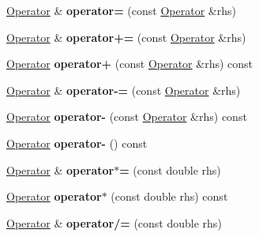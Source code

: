 \begin{DoxyCompactItemize}
\item 
\hypertarget{classOperator_afad114ba9dee8b9c08af0b5d27c3ba86}{\hyperlink{classOperator}{Operator} \& {\bfseries operator=} (const \hyperlink{classOperator}{Operator} \&rhs)}\label{classOperator_afad114ba9dee8b9c08af0b5d27c3ba86}

\item 
\hypertarget{classOperator_a0b20b0fedb0f49c4a2e69507cdcb540b}{\hyperlink{classOperator}{Operator} \& {\bfseries operator+=} (const \hyperlink{classOperator}{Operator} \&rhs)}\label{classOperator_a0b20b0fedb0f49c4a2e69507cdcb540b}

\item 
\hypertarget{classOperator_a67d89d71379a609aa018178afe1adb8d}{\hyperlink{classOperator}{Operator} {\bfseries operator+} (const \hyperlink{classOperator}{Operator} \&rhs) const }\label{classOperator_a67d89d71379a609aa018178afe1adb8d}

\item 
\hypertarget{classOperator_a1235ee7e0ba5220a831ac0c01b2210b9}{\hyperlink{classOperator}{Operator} \& {\bfseries operator-\/=} (const \hyperlink{classOperator}{Operator} \&rhs)}\label{classOperator_a1235ee7e0ba5220a831ac0c01b2210b9}

\item 
\hypertarget{classOperator_ac25a9769a621623062b922cb9a40a489}{\hyperlink{classOperator}{Operator} {\bfseries operator-\/} (const \hyperlink{classOperator}{Operator} \&rhs) const }\label{classOperator_ac25a9769a621623062b922cb9a40a489}

\item 
\hypertarget{classOperator_aa06ee3d5828d7bc43b3aca693ac0ef25}{\hyperlink{classOperator}{Operator} {\bfseries operator-\/} () const }\label{classOperator_aa06ee3d5828d7bc43b3aca693ac0ef25}

\item 
\hypertarget{classOperator_a9398ce826d8ef57e69a1aa776734080f}{\hyperlink{classOperator}{Operator} \& {\bfseries operator$\ast$=} (const double rhs)}\label{classOperator_a9398ce826d8ef57e69a1aa776734080f}

\item 
\hypertarget{classOperator_a0eeafc807e6ef6e3d30810f114e249bb}{\hyperlink{classOperator}{Operator} {\bfseries operator$\ast$} (const double rhs) const }\label{classOperator_a0eeafc807e6ef6e3d30810f114e249bb}

\item 
\hypertarget{classOperator_a53af250702ec7c48de5397b209ebc09e}{\hyperlink{classOperator}{Operator} \& {\bfseries operator/=} (const double rhs)}\label{classOperator_a53af250702ec7c48de5397b209ebc09e}


\end{DoxyCompactItemize}

